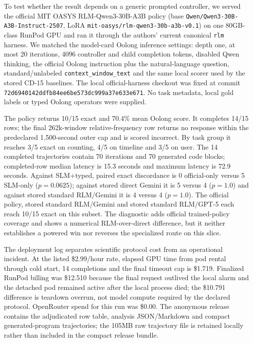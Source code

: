 To test whether the result depends on a generic prompted controller, we served the official MIT OASYS RLM-Qwen3-30B-A3B policy (base \texttt{Qwen/Qwen3-30B-A3B-Instruct-2507}, LoRA \texttt{mit-oasys/rlm-qwen3-30b-a3b-v0.1}) on one 80GB-class RunPod GPU and ran it through the authors' current canonical \texttt{rlm} harness. We matched the model-card Oolong inference settings: depth one, at most 20 iterations, 4096 controller and child completion tokens, disabled Qwen thinking, the official Oolong instruction plus the natural-language question, standard/unlabeled \texttt{context\_window\_text} and the same local scorer used by the stored CD-15 baselines. The local official-harness checkout was fixed at commit \texttt{72d6940142ddfb84e\allowbreak e6be573dc999a37e633e671}. No task metadata, local gold labels or typed Oolong operators were supplied.

The policy returns 10/15 exact and 70.4\% mean Oolong score. It completes 14/15 rows; the final 262k-window relative-frequency row returns no response within the predeclared 1,500-second outer cap and is scored incorrect. By task group it reaches 3/5 exact on counting, 4/5 on timeline and 3/5 on user. The 14 completed trajectories contain 70 iterations and 70 generated code blocks; completed-row median latency is 15.3 seconds and maximum latency is 72.9 seconds. Against SLM+typed, paired exact discordance is 0 official-only versus 5 SLM-only ($p=0.0625$); against stored direct Gemini it is 5 versus 4 ($p=1.0$) and against stored standard RLM/Gemini it is 4 versus 4 ($p=1.0$). The official policy, stored standard RLM/Gemini and stored standard RLM/GPT-5 each reach 10/15 exact on this subset. The diagnostic adds official trained-policy coverage and shows a numerical RLM-over-direct difference, but it neither establishes a powered win nor reverses the specialized route on this slice.

The deployment log separates scientific protocol cost from an operational incident. At the listed \$2.99/hour rate, elapsed GPU time from pod rental through cold start, 14 completions and the final timeout cap is \$1.719. Finalized RunPod billing was \$12.510 because the final request outlived the local alarm and the detached pod remained active after the local process died; the \$10.791 difference is teardown overrun, not model compute required by the declared protocol. OpenRouter spend for this run was \$0.00. The anonymous release contains the adjudicated row table, analysis JSON/Markdown and compact generated-program trajectories; the 105MB raw trajectory file is retained locally rather than included in the compact release bundle.


